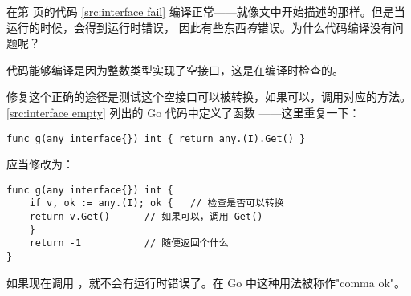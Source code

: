 \begin{Exercise}[title={接口和编译},difficulty=6]
\Question
在第 \pageref{src:interface fail} 页的代码 \ref{src:interface fail} 
编译正常——就像文中开始描述的那样。但是当运行的时候，会得到运行时错误，
因此有些东西\emph{有}错误。为什么代码编译没有问题呢？
\end{Exercise}

\begin{Answer}
\Question
代码能够编译是因为整数类型实现了空接口，这是在编译时检查的。

修复这个正确的途径是测试这个空接口可以被转换，如果可以，调用对应的方法。
\ref{src:interface empty} 列出的 Go 代码中定义了函数 ——这里重复一下：
\begin{lstlisting}
func g(any interface{}) int { return any.(I).Get() }
\end{lstlisting}

\noindent{}应当修改为：
\begin{lstlisting}
func g(any interface{}) int {
    if v, ok := any.(I); ok {	// 检查是否可以转换
	return v.Get()		// 如果可以，调用 Get()
    }
    return -1			// 随便返回个什么
}
\end{lstlisting}
如果现在调用 ，就不会有运行时错误了。在 Go 中这种用法被称作"comma ok"。
\end{Answer}
